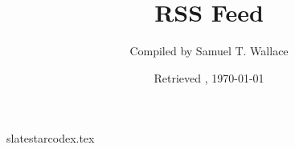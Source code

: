 \documentclass{blogTemplate}
\title{RSS Feed}
\author{Compiled by Samuel T. Wallace}
\date{Retrieved \currenttime, \today}
\begin{document}
\maketitle
\tableofcontents

{slatestarcodex.tex}
\end{document}
